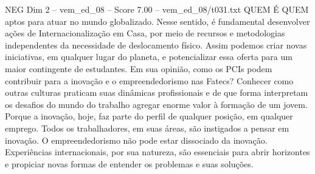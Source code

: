 \begin{textsample}{NEG Dim 2 – vem\_ed\_08 – Score 7.00 – vem\_ed\_08/t031.txt}  \label{ex:f2_neg_161}
QUEM É QUEM aptos para atuar no mundo globalizado.
Nesse sentido, é fundamental desenvolver ações de Internacionalização em Casa, por meio de recursos e metodologias independentes da necessidade de deslocamento físico.
Assim podemos criar novas iniciativas, em qualquer lugar do planeta, e potencializar essa oferta para um maior contingente de estudantes.
Em sua opinião, como os PCIs podem contribuir para a inovação e o empreendedorismo nas Fatecs?
Conhecer como outras culturas praticam suas dinâmicas profissionais e de que forma interpretam os desafios do mundo do trabalho agregar enorme valor à formação de um jovem.
Porque a inovação, hoje, faz parte do perfil de qualquer posição, em qualquer emprego.
Todos os trabalhadores, em suas áreas, são instigados a pensar em inovação.
O empreendedorismo não pode estar dissociado da inovação.
Experiências internacionais, por sua natureza, são essenciais para abrir horizontes e propiciar novas formas de entender os problemas e suas soluções.

\end{textsample}
